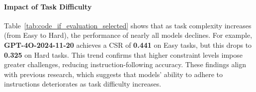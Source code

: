 
\paragraph{Impact of Task Difficulty}
Table~\ref{tab:code_if_evaluation_selected} shows that as task complexity increases (from Easy to Hard), the performance of nearly all models declines. For example, \textbf{GPT-4O-2024-11-20} achieves a CSR of \textbf{0.441} on Easy tasks, but this drops to \textbf{0.325} on Hard tasks. This trend confirms that higher constraint levels impose greater challenges, reducing instruction-following accuracy. These findings align with previous research, which suggests that models’ ability to adhere to instructions deteriorates as task difficulty increases.


